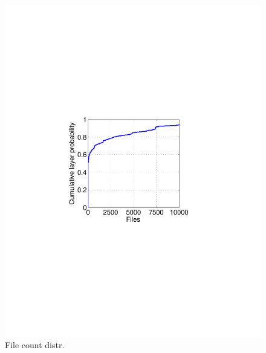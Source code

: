 
\begin{figure}
	\centering
	\begin{minipage}{0.23\textwidth}
		\centering
		\includegraphics[width=1\textwidth]{graphs/file_cnt.pdf}
		\caption{File count distr.}
		\label{fig_file_cnt}
	\end{minipage}
	\begin{minipage}{0.23\textwidth}
		\centering

\end{minipage}
\end{figure}

